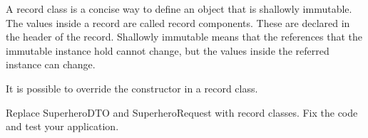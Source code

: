 A record class is a concise way to define an object that is shallowly immutable. The values inside a record are called record components. These are declared in the header of the record. Shallowly immutable means that the references that the immutable instance hold cannot change, but the values inside the referred instance can change.

It is possible to override the constructor in a record class.

\begin{oefening}
Replace SuperheroDTO and SuperheroRequest with record classes. Fix the code and test your application.
\end{oefening}